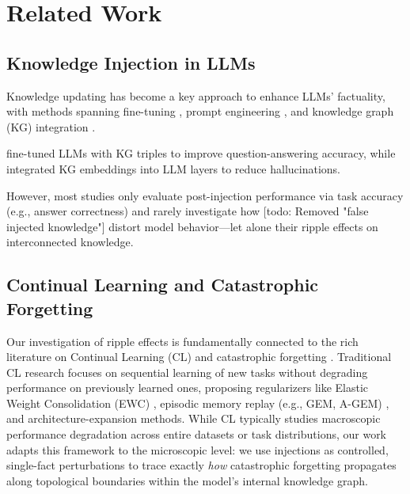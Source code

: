\section{Related Work}


\subsection{Knowledge Injection in LLMs}
Knowledge updating has become a key approach to enhance LLMs' factuality, with methods spanning fine-tuning \cite{zhu2020modifying}, prompt engineering \cite{wei2022chain}, and knowledge graph (KG) integration \cite{pan2024roadmap, yasunaga2021qagnn}. 


\citet{bosselut2019comet} fine-tuned LLMs with KG triples to improve question-answering accuracy, while \citet{yasunaga2021qagnn} integrated KG embeddings into LLM layers to reduce hallucinations. 

However, most studies only evaluate post-injection performance via task accuracy (e.g., answer correctness) and rarely investigate how [todo: Removed "false injected knowledge"]  distort model behavior—let alone their ripple effects on interconnected knowledge.


\subsection{Continual Learning and Catastrophic Forgetting}
Our investigation of ripple effects is fundamentally connected to the rich literature on Continual Learning (CL) and catastrophic forgetting \cite{mccloskey2017overcoming, lopez2017gradient}. Traditional CL research focuses on sequential learning of new tasks without degrading performance on previously learned ones, proposing regularizers like Elastic Weight Consolidation (EWC) \cite{kirkpatrick2017overcoming}, episodic memory replay (e.g., GEM, A-GEM) \cite{lopez2017gradient, chaudhry2018efficient}, and architecture-expansion methods. While CL typically studies macroscopic performance degradation across entire datasets or task distributions, our work adapts this framework to the microscopic level: we use injections as controlled, single-fact perturbations to trace exactly \textit{how} catastrophic forgetting propagates along topological boundaries within the model's internal knowledge graph.


